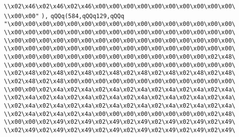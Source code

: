 \verb|\\x02\x46\x02\x46\x02\x46\x00\x00\x00\x00\x00\x00\x00\x00\x00\x00\|\newline
\verb|\\x00\x00"|\newline
\verb|),|\newline
\verb|qQQq(584,qQQq129,qQQq|\newline
\verb|"\x00\x00\x00\x00\x00\x00\x00\x00\x00\x00\x00\x00\x00\x00\x00\x00\|\newline
\verb|\\x00\x00\x00\x00\x00\x00\x00\x00\x00\x00\x00\x00\x00\x00\x00\x00\|\newline
\verb|\\x00\x00\x00\x00\x00\x00\x00\x00\x00\x00\x00\x00\x00\x00\x00\x00\|\newline
\verb|\\x00\x00\x00\x00\x00\x00\x00\x00\x00\x00\x00\x00\x00\x00\x00\x00\|\newline
\verb|\\x00\x00\x00\x00\x00\x00\x00\x00\x00\x00\x00\x00\x00\x00\x02\x48\|\newline
\verb|\\x00\x00\x00\x00\x00\x00\x00\x00\x00\x00\x00\x00\x00\x00\x00\x00\|\newline
\verb|\\x02\x48\x02\x48\x02\x48\x02\x48\x02\x48\x02\x48\x02\x48\x02\x48\|\newline
\verb|\\x02\x48\x02\x48\x00\x00\x00\x00\x00\x00\x00\x00\x00\x00\x00\x00\|\newline
\verb|\\x00\x00\x02\x4a\x02\x4a\x02\x4a\x02\x4a\x02\x4a\x02\x4a\x02\x4a\|\newline
\verb|\\x02\x4a\x02\x4a\x02\x4a\x02\x4a\x02\x4a\x02\x4a\x02\x4a\x02\x4a\|\newline
\verb|\\x02\x4a\x02\x4a\x02\x4a\x02\x4a\x02\x4a\x02\x4a\x02\x4a\x02\x4a\|\newline
\verb|\\x02\x4a\x02\x4a\x02\x4a\x00\x00\x00\x00\x00\x00\x00\x00\x02\x48\|\newline
\verb|\\x00\x00\x02\x49\x02\x49\x02\x49\x02\x49\x02\x49\x02\x49\x02\x49\|\newline
\verb|\\x02\x49\x02\x49\x02\x49\x02\x49\x02\x49\x02\x49\x02\x49\x02\x49\|\newline
